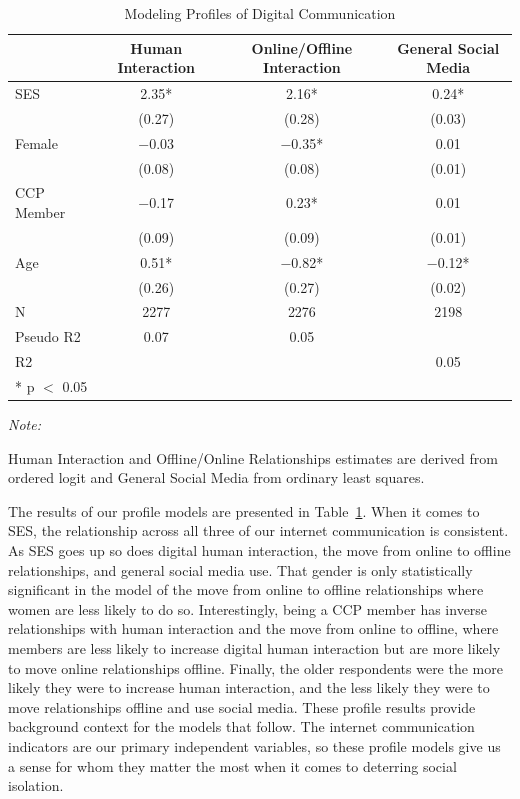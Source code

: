 \documentclass[
  letterpaper,
  DIV=11,
  numbers=noendperiod]{scrartcl}
\begin{document}
\hypertarget{tbl-profile-models}{}
\begin{table}
\caption{\label{tbl-profile-models}Modeling Profiles of Digital Communication }\tabularnewline

\centering
\begin{threeparttable}
\begin{tabular}[t]{lccc}
\toprule
  & Human Interaction & Online/Offline Interaction & General Social Media\\
\midrule
SES & \num{2.35}* & \num{2.16}* & \num{0.24}*\\
 & (\num{0.27}) & (\num{0.28}) & (\num{0.03})\\
Female & \num{-0.03} & \num{-0.35}* & \num{0.01}\\
 & (\num{0.08}) & (\num{0.08}) & (\num{0.01})\\
CCP Member & \num{-0.17} & \num{0.23}* & \num{0.01}\\
 & (\num{0.09}) & (\num{0.09}) & (\num{0.01})\\
Age & \num{0.51}* & \num{-0.82}* & \num{-0.12}*\\
 & (\num{0.26}) & (\num{0.27}) & (\num{0.02})\\
\midrule
N & \num{2277} & \num{2276} & \num{2198}\\
Pseudo R2 & \num{0.07} & \num{0.05} & \\
R2 &  &  & \num{0.05}\\
\bottomrule
\multicolumn{4}{l}{\rule{0pt}{1em}* p $<$ 0.05}\\
\end{tabular}
\begin{tablenotes}
\item \textit{Note: } 
\item Human Interaction and Offline/Online Relationships estimates are derived from ordered logit and General Social Media from ordinary least squares.
\end{tablenotes}
\end{threeparttable}
\end{table}

The results of our profile models are presented in
Table~\ref{tbl-profile-models}. When it comes to SES, the relationship
across all three of our internet communication is consistent. As SES
goes up so does digital human interaction, the move from online to
offline relationships, and general social media use. That gender is only
statistically significant in the model of the move from online to
offline relationships where women are less likely to do so.
Interestingly, being a CCP member has inverse relationships with human
interaction and the move from online to offline, where members are less
likely to increase digital human interaction but are more likely to move
online relationships offline. Finally, the older respondents were the
more likely they were to increase human interaction, and the less likely
they were to move relationships offline and use social media. These
profile results provide background context for the models that follow.
The internet communication indicators are our primary independent
variables, so these profile models give us a sense for whom they matter
the most when it comes to deterring social isolation.
\end{document}
